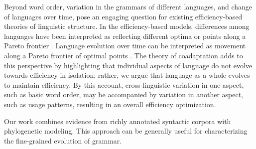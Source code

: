 \documentclass[9pt,twocolumn,twoside,lineno]{pnas-new}
\begin{document}








Beyond word order, variation in the grammars of different languages, and change of languages over time, pose an engaging question for existing efficiency-based theories of linguistic structure.
In the efficiency-based models, differences among languages have been interpreted as reflecting different optima or points along a Pareto frontier \citep{kemp2018semantic, zaslavsky2018efficient}.
Language evolution over time can be interpreted as movement along a Pareto frontier of optimal points \citep{zaslavsky2019evolution}. %
The theory of coadaptation adds to this perspective by highlighting that individual aspects of language do not evolve towards efficiency in isolation; rather, we argue that language as a whole evolves to maintain efficiency.
By this account, cross-linguistic variation in one aspect, such as basic word order, may be accompanied by variation in another aspect, such as usage patterns, resulting in an overall efficiency optimization.

Our work combines evidence from richly annotated syntactic corpora with phylogenetic modeling. This approach can be generally useful for characterizing the fine-grained evolution of grammar.

\end{document}

